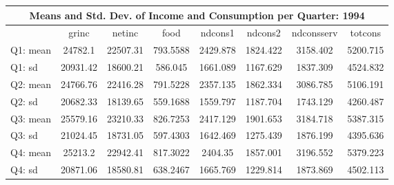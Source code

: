 \begin{tabular}{l*{7}{c}}
\hline\hline
\multicolumn{8}{c}{Means and Std. Dev. of Income and Consumption per Quarter: 1994}  \\
\hline    
            &       grinc&      netinc&        food&     ndcons1&     ndcons2&  ndconsserv&     totcons\\
\hline
Q1: mean        &     24782.1&    22507.31&    793.5588&    2429.878&    1824.422&    3158.402&    5200.715\\
Q1: sd &    20931.42&    18600.21&     586.045&    1661.089&    1167.629&    1837.309&    4524.832\\
Q2: mean    &    24766.76&    22416.28&    791.5228&    2357.135&    1862.334&    3086.785&    5106.191\\
Q2: sd  &    20682.33&    18139.65&    559.1688&    1559.797&    1187.704&    1743.129&    4260.487\\
Q3: mean     &    25579.16&    23210.33&    826.7253&    2417.129&    1901.653&    3184.718&    5387.315\\
Q3: sd     &    21024.45&    18731.05&    597.4303&    1642.469&    1275.439&    1876.199&    4395.636\\
Q4: mean     &     25213.2&    22942.41&    817.3022&     2404.35&    1857.001&    3196.552&    5379.223\\
Q4: sd   &    20871.06&    18580.81&    638.2467&    1665.769&    1229.814&    1873.869&    4502.113\\
\hline\hline
\end{tabular}
